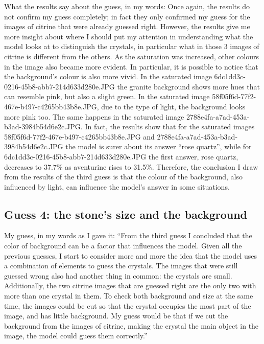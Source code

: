 \documentclass[11pt]{article}
\begin{document}
What the results say about the guess, in my words: Once again, the results do
not confirm my guess completely; in fact they only confirmed my guess for the
images of citrine that were already guessed right. However, the results give me
more insight about where I should put my attention in understanding what the
model looks at to distinguish the crystals, in particular what in those 3 images
of citrine is different from the others. As the saturation was increased, other
colours in the image also became more evident. In particular, it is possible to
notice that the background's colour is also more vivid. In the saturated image
6dc1dd3c-0216-45b8-abb7-214d633d280e.JPG the granite background shows more hues
that can resemble pink, but also a slight green. In the saturated image
58f05f6d-77f2-467e-b497-c4265bb43b8e.JPG, due to the type of light, the
background looks more pink too. The same happens in the saturated image
2788e4fa-a7ad-453a-b3ad-3984b54d6e2c.JPG. In fact, the results show that for the
saturated images 58f05f6d-77f2-467e-b497-c4265bb43b8e.JPG and
2788e4fa-a7ad-453a-b3ad-3984b54d6e2c.JPG the model is surer about its answer
``rose quartz'', while for 6dc1dd3c-0216-45b8-abb7-214d633d280e.JPG the first
answer, rose quartz, decreases to 37.7\% as aventurine rises to 31.5\%.
Therefore, the conclusion I draw from the results of the third guess is that the
colour of the background, also influenced by light, can influence the model's
answer in some situations.

\subsection*{Guess 4: the stone's size and the background}

My guess, in my words as I gave it: ``From the third guess I concluded that the
color of background can be a factor that influences the model. Given all the
previous guesses, I start to consider more and more the idea that the model uses
a combination of elements to guess the crystals. The images that were still
guessed wrong also had another thing in common: the crystals are small.
Additionally, the two citrine images that are guessed right are the only two
with more than one crystal in them. To check both background and size at the
same time, the images could be cut so that the crystal occupies the most part of
the image, and has little background. My guess would be that if we cut the
background from the images of citrine, making the crystal the main object in the
image, the model could guess them correctly.''
\end{document}

